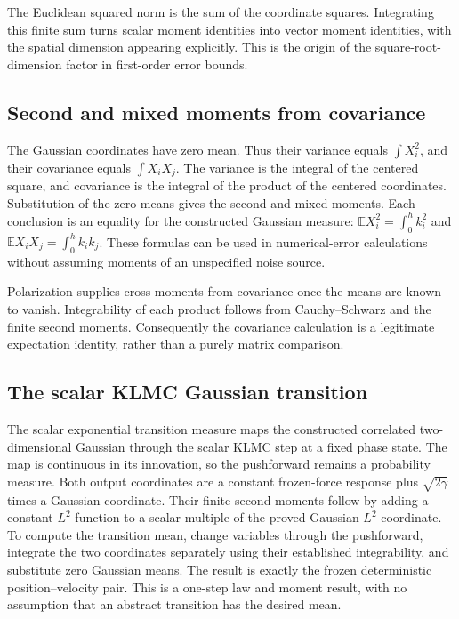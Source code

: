 \documentclass[11pt,a4paper]{report}
\begin{document}
The Euclidean squared norm is the sum of the coordinate squares. Integrating this finite sum turns scalar moment identities into vector moment identities, with the spatial dimension appearing explicitly. This is the origin of the square-root-dimension factor in first-order error bounds.

\subsection{\texorpdfstring{Second and mixed moments from covariance}{Second and mixed moments from covariance}}
\label{report-step-KineticLangevin-Gaussian-lean-6}


The Gaussian coordinates have zero mean. Thus their variance equals \(\int X_i^2\), and their covariance equals \(\int X_iX_j\). The variance is the integral of the centered square, and covariance is the integral of the product of the centered coordinates. Substitution of the zero means gives the second and mixed moments. Each conclusion is an equality for the constructed Gaussian measure: \(\mathbb E X_i^2=\int_0^hk_i^2\) and \(\mathbb E X_iX_j=\int_0^hk_ik_j\). These formulas can be used in numerical-error calculations without assuming moments of an unspecified noise source.



Polarization supplies cross moments from covariance once the means are known to vanish. Integrability of each product follows from Cauchy–Schwarz and the finite second moments. Consequently the covariance calculation is a legitimate expectation identity, rather than a purely matrix comparison.

\subsection{\texorpdfstring{The scalar KLMC Gaussian transition}{The scalar KLMC Gaussian transition}}
\label{report-step-KineticLangevin-Gaussian-lean-7}


The scalar exponential transition measure maps the constructed correlated two-dimensional Gaussian through the scalar KLMC step at a fixed phase state. The map is continuous in its innovation, so the pushforward remains a probability measure. Both output coordinates are a constant frozen-force response plus \(\sqrt{2\gamma}\) times a Gaussian coordinate. Their finite second moments follow by adding a constant \(L^{2}\) function to a scalar multiple of the proved Gaussian \(L^{2}\) coordinate. To compute the transition mean, change variables through the pushforward, integrate the two coordinates separately using their established integrability, and substitute zero Gaussian means. The result is exactly the frozen deterministic position–velocity pair. This is a one-step law and moment result, with no assumption that an abstract transition has the desired mean.
\end{document}
